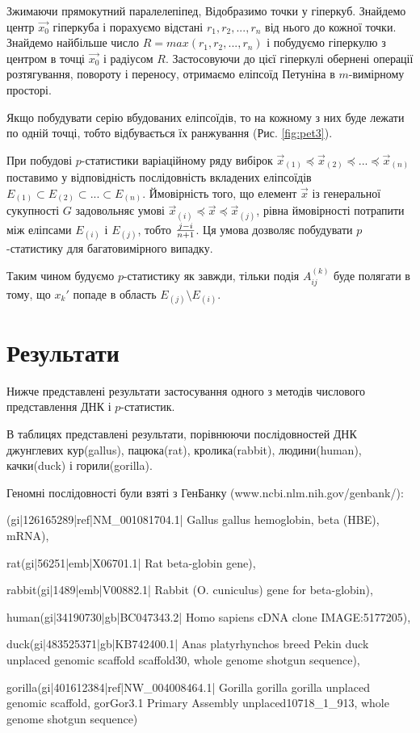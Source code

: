 \documentclass[14pt,a4paper,titlepage]{extarticle}
\begin{document}
Зжимаючи прямокутний паралелепіпед, Відобразимо точки у гіперкуб. Знайдемо
центр $\overrightarrow{x_0}$ гіперкуба і порахуємо відстані $r_1,r_2,...,r_n$
від нього до кожної точки. Знайдемо найбільше число $R=max(r_1,r_2,...,r_n)$ і
побудуємо гіперкулю з центром в точці $\overrightarrow{x_0}$ і радіусом $R$.
Застосовуючи до цієї гіперкулі обернені операції розтягування, повороту і
переносу, отримаємо еліпсоїд Петуніна в $m$-вимірному просторі.
\par

Якщо побудувати серію вбудованих еліпсоїдів, то на кожному з них буде лежати по одній точці, тобто відбувається їх ранжування (Рис. \ref{fig:pet3}).

\par

При побудові $p$-статистики варіаційному ряду вибірок
$\overrightarrow{x}_{(1)} \preceq \overrightarrow{x}_{(2)} \preceq
... \preceq \overrightarrow{x}_{(n)}$ поставимо у відповідність послідовність
вкладених еліпсоїдів $E_{(1)} \subset E_{(2)} \subset ... \subset E_{(n)}$. Ймовірність того, що елемент $\overrightarrow{x}$ із генеральної сукупності $G$ задовольняє умові $\overrightarrow{x}_{(i)} \preceq \overrightarrow{x} \preceq
\overrightarrow{x}_{(j)}$, рівна ймовірності потрапити між еліпсами $E_{(i)}$ і $E_{(j)}$, тобто $j-i \over n+1$. Ця умова дозволяє побудувати $p$-статистику для багатовимірного випадку. \par
Таким чином будуємо $p$-статистику як завжди, тільки подія $A_{ij}^{(k)}$ буде полягати в тому, що $x_k'$ попаде в область $E_{(j)} \setminus E_{(i)}$.

\newpage

\section{Результати}
Нижче представлені результати застосування одного з методів числового представлення ДНК і $p$-статистик.\par
В таблицях представлені результати, порівнюючи послідовностей ДНК джунглевих
кур(gallus), пацюка(rat), кролика(rabbit), людини(human), качки(duck) і
горили(gorilla).\par
Геномні послідовності були взяті з ГенБанку (www.ncbi.nlm.nih.gov/genbank/):\par
(gi|126165289|ref|NM\_001081704.1| Gallus gallus hemoglobin, beta (HBE), mRNA),\par
rat(gi|56251|emb|X06701.1| Rat beta-globin gene),\par
rabbit(gi|1489|emb|V00882.1| Rabbit (O. cuniculus) gene for beta-globin),\par
human(gi|34190730|gb|BC047343.2| Homo sapiens cDNA clone IMAGE:5177205),\par
duck(gi|483525371|gb|KB742400.1| Anas platyrhynchos breed Pekin duck unplaced genomic scaffold scaffold30, whole genome shotgun sequence),\par
gorilla(gi|401612384|ref|NW\_004008464.1| Gorilla gorilla gorilla unplaced genomic scaffold, gorGor3.1 Primary Assembly unplaced10718\_1\_913, whole genome shotgun sequence)\par
\end{document}
